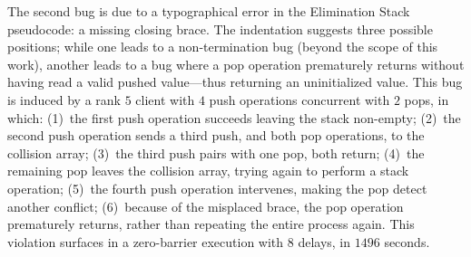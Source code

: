 The second bug is due to a typographical error in the Elimination Stack
pseudocode: a missing closing brace. The indentation suggests three possible
positions; while one leads to a non-termination bug (beyond the scope of this
work), another leads to a bug where a pop operation prematurely returns without
having read a valid pushed value---thus returning an uninitialized value. This
bug is induced by a rank $5$ client with $4$ push operations concurrent with
$2$ pops, in which: (1)~the first push operation succeeds leaving the stack
non-empty; (2)~the second push operation sends a third push, and both pop
operations, to the collision array; (3)~the third push pairs with one pop, both
return; (4)~the remaining pop leaves the collision array, trying again to
perform a stack operation; (5)~the fourth push operation intervenes, making the
pop detect another conflict; (6)~because of the misplaced brace, the pop
operation prematurely returns, rather than repeating the entire process again.
This violation surfaces in a zero-barrier execution with $8$ delays, in $1496$
seconds.

